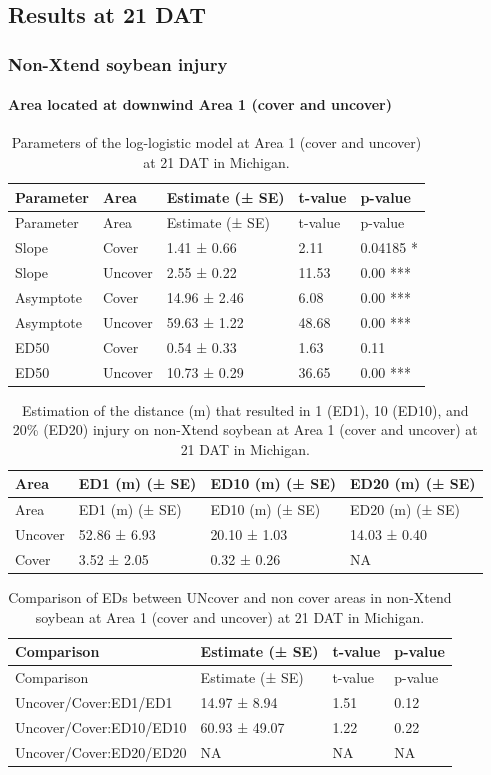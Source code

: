 \documentclass[]{article}
\let\oldparagraph\paragraph
\renewcommand{\paragraph}[1]{\oldparagraph{#1}\mbox{}}
\begin{document}
\newpage

\pagebreak

\subsection{Results at 21 DAT}\label{results-at-21-dat-1}

\subsubsection{Non-Xtend soybean
injury}\label{non-xtend-soybean-injury-3}

\paragraph{Area located at downwind Area 1 (cover and
uncover)}\label{area-located-at-downwind-area-1-cover-and-uncover}

\begin{longtable}[]{@{}lllll@{}}
\caption{Parameters of the log-logistic model at Area 1 (cover and
uncover) at 21 DAT in Michigan.}\tabularnewline
\toprule
Parameter & Area & Estimate (± SE) & t-value & p-value\tabularnewline
\midrule
\endfirsthead
\toprule
Parameter & Area & Estimate (± SE) & t-value & p-value\tabularnewline
\midrule
\endhead
Slope & Cover & 1.41 ± 0.66 & 2.11 & 0.04185 *\tabularnewline
Slope & Uncover & 2.55 ± 0.22 & 11.53 & 0.00 ***\tabularnewline
Asymptote & Cover & 14.96 ± 2.46 & 6.08 & 0.00 ***\tabularnewline
Asymptote & Uncover & 59.63 ± 1.22 & 48.68 & 0.00 ***\tabularnewline
ED50 & Cover & 0.54 ± 0.33 & 1.63 & 0.11\tabularnewline
ED50 & Uncover & 10.73 ± 0.29 & 36.65 & 0.00 ***\tabularnewline
\bottomrule
\end{longtable}

\begin{longtable}[]{@{}llll@{}}
\caption{Estimation of the distance (m) that resulted in 1 (ED1), 10
(ED10), and 20\% (ED20) injury on non-Xtend soybean at Area 1 (cover and
uncover) at 21 DAT in Michigan.}\tabularnewline
\toprule
Area & ED1 (m) (± SE) & ED10 (m) (± SE) & ED20 (m) (± SE)\tabularnewline
\midrule
\endfirsthead
\toprule
Area & ED1 (m) (± SE) & ED10 (m) (± SE) & ED20 (m) (± SE)\tabularnewline
\midrule
\endhead
Uncover & 52.86 ± 6.93 & 20.10 ± 1.03 & 14.03 ± 0.40\tabularnewline
Cover & 3.52 ± 2.05 & 0.32 ± 0.26 & NA\tabularnewline
\bottomrule
\end{longtable}

\begin{longtable}[]{@{}llll@{}}
\caption{Comparison of EDs between UNcover and non cover areas in
non-Xtend soybean at Area 1 (cover and uncover) at 21 DAT in
Michigan.}\tabularnewline
\toprule
Comparison & Estimate (± SE) & t-value & p-value\tabularnewline
\midrule
\endfirsthead
\toprule
Comparison & Estimate (± SE) & t-value & p-value\tabularnewline
\midrule
\endhead
Uncover/Cover:ED1/ED1 & 14.97 ± 8.94 & 1.51 & 0.12\tabularnewline
Uncover/Cover:ED10/ED10 & 60.93 ± 49.07 & 1.22 & 0.22\tabularnewline
Uncover/Cover:ED20/ED20 & NA & NA & NA\tabularnewline
\bottomrule
\end{longtable}
\end{document}
